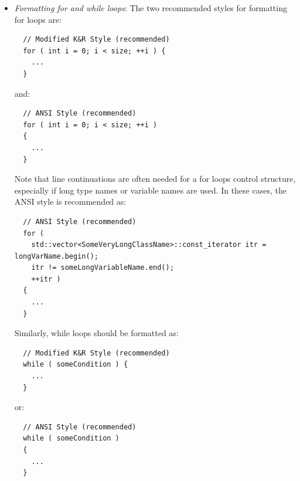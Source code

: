 \begin{itemize}
\begin{itemize}
  Also, if needed, the case blocks can be wrapped in braces as:

  {\small\begin{verbatim}
  // Modified K&R Style (recommended)
  switch(someEnumValue) {
    case ENUM_VALUE1: {
      ...
      break;
    }
    case ENUM_VALUE2: {
      ...
      break;
    }    
    default: {
      TEST_FOR_EXCEPT("Should never get there!");
    }
  }
  \end{verbatim}}

  {}\noindent{}and

  {\small\begin{verbatim}
  // ANSI Style (recommended)
  switch(someEnumValue)
  {
    case ENUM_VALUE1:
    {
      ...
      break;
    }
    case ENUM_VALUE2:
    {
      ...
      break;
    }    
    default:
    {
      TEST_FOR_EXCEPT("Should never get there!");
    }
  }
  \end{verbatim}}

  {}\item\textit{Formatting for and while loops}: The two recommended styles
  for formatting for loops are:

  {\small\begin{verbatim}
  // Modified K&R Style (recommended)
  for ( int i = 0; i < size; ++i ) {
    ...
  }
  \end{verbatim}}

  {}\noindent{}and:

  {\small\begin{verbatim}
  // ANSI Style (recommended)
  for ( int i = 0; i < size; ++i )
  {
    ...
  }
  \end{verbatim}}

  Note that line continuations are often needed for a for loops control
  structure, especially if long type names or variable names are used.  In
  these cases, the ANSI style is recommended as:

  {\small\begin{verbatim}
  // ANSI Style (recommended)
  for (
    std::vector<SomeVeryLongClassName>::const_iterator itr = longVarName.begin();
    itr != someLongVariableName.end();
    ++itr )
  {
    ...
  }
  \end{verbatim}}

  Similarly, while loops should be formatted as:

  {\small\begin{verbatim}
  // Modified K&R Style (recommended)
  while ( someCondition ) {
    ...
  }
  \end{verbatim}}

  {}\noindent{}or:

  {\small\begin{verbatim}
  // ANSI Style (recommended)
  while ( someCondition )
  {
    ...
  }
  \end{verbatim}}

  \end{itemize}

\end{itemize}

